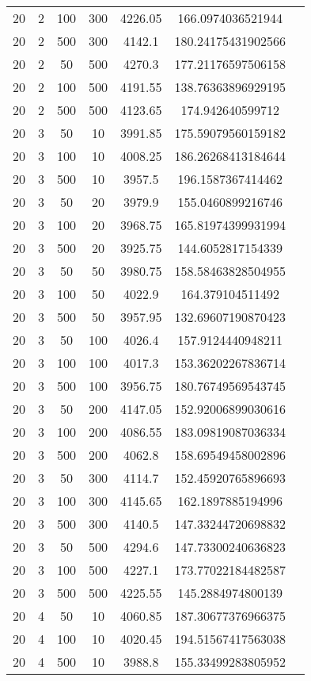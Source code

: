 {\begin{longtabu}{S
S
S
S
S
S[round-mode=places,round-precision=0]
S[round-mode=places,round-precision=0]}
20 & 2 & 100 & 300 & 4226.05 & 166.0974036521944 \\
20 & 2 & 500 & 300 & 4142.1 & 180.24175431902566 \\
20 & 2 & 50 & 500 & 4270.3 & 177.21176597506158 \\
20 & 2 & 100 & 500 & 4191.55 & 138.76363896929195 \\
20 & 2 & 500 & 500 & 4123.65 & 174.942640599712 \\
20 & 3 & 50 & 10 & 3991.85 & 175.59079560159182 \\
20 & 3 & 100 & 10 & 4008.25 & 186.26268413184644 \\
20 & 3 & 500 & 10 & 3957.5 & 196.1587367414462 \\
20 & 3 & 50 & 20 & 3979.9 & 155.0460899216746 \\
20 & 3 & 100 & 20 & 3968.75 & 165.81974399931994 \\
20 & 3 & 500 & 20 & 3925.75 & 144.6052817154339 \\
20 & 3 & 50 & 50 & 3980.75 & 158.58463828504955 \\
20 & 3 & 100 & 50 & 4022.9 & 164.379104511492 \\
20 & 3 & 500 & 50 & 3957.95 & 132.69607190870423 \\
20 & 3 & 50 & 100 & 4026.4 & 157.9124440948211 \\
20 & 3 & 100 & 100 & 4017.3 & 153.36202267836714 \\
20 & 3 & 500 & 100 & 3956.75 & 180.76749569543745 \\
20 & 3 & 50 & 200 & 4147.05 & 152.92006899030616 \\
20 & 3 & 100 & 200 & 4086.55 & 183.09819087036334 \\
20 & 3 & 500 & 200 & 4062.8 & 158.69549458002896 \\
20 & 3 & 50 & 300 & 4114.7 & 152.45920765896693 \\
20 & 3 & 100 & 300 & 4145.65 & 162.1897885194996 \\
20 & 3 & 500 & 300 & 4140.5 & 147.33244720698832 \\
20 & 3 & 50 & 500 & 4294.6 & 147.73300240636823 \\
20 & 3 & 100 & 500 & 4227.1 & 173.77022184482587 \\
20 & 3 & 500 & 500 & 4225.55 & 145.2884974800139 \\
20 & 4 & 50 & 10 & 4060.85 & 187.30677376966375 \\
20 & 4 & 100 & 10 & 4020.45 & 194.51567417563038 \\
20 & 4 & 500 & 10 & 3988.8 & 155.33499283805952 \\

\end{longtabu}}
